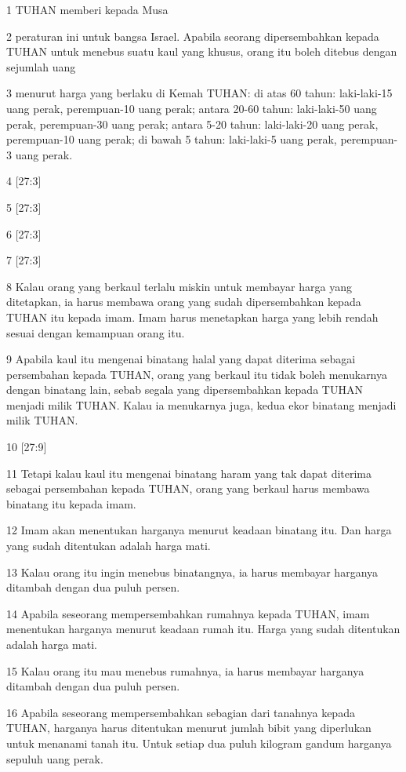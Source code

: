 \par 1 TUHAN memberi kepada Musa
\par 2 peraturan ini untuk bangsa Israel. Apabila seorang dipersembahkan kepada TUHAN untuk menebus suatu kaul yang khusus, orang itu boleh ditebus dengan sejumlah uang
\par 3 menurut harga yang berlaku di Kemah TUHAN: di atas 60 tahun: laki-laki-15 uang perak, perempuan-10 uang perak; antara 20-60 tahun: laki-laki-50 uang perak, perempuan-30 uang perak; antara 5-20 tahun: laki-laki-20 uang perak, perempuan-10 uang perak; di bawah 5 tahun: laki-laki-5 uang perak, perempuan-3 uang perak.
\par 4 [27:3]
\par 5 [27:3]
\par 6 [27:3]
\par 7 [27:3]
\par 8 Kalau orang yang berkaul terlalu miskin untuk membayar harga yang ditetapkan, ia harus membawa orang yang sudah dipersembahkan kepada TUHAN itu kepada imam. Imam harus menetapkan harga yang lebih rendah sesuai dengan kemampuan orang itu.
\par 9 Apabila kaul itu mengenai binatang halal yang dapat diterima sebagai persembahan kepada TUHAN, orang yang berkaul itu tidak boleh menukarnya dengan binatang lain, sebab segala yang dipersembahkan kepada TUHAN menjadi milik TUHAN. Kalau ia menukarnya juga, kedua ekor binatang menjadi milik TUHAN.
\par 10 [27:9]
\par 11 Tetapi kalau kaul itu mengenai binatang haram yang tak dapat diterima sebagai persembahan kepada TUHAN, orang yang berkaul harus membawa binatang itu kepada imam.
\par 12 Imam akan menentukan harganya menurut keadaan binatang itu. Dan harga yang sudah ditentukan adalah harga mati.
\par 13 Kalau orang itu ingin menebus binatangnya, ia harus membayar harganya ditambah dengan dua puluh persen.
\par 14 Apabila seseorang mempersembahkan rumahnya kepada TUHAN, imam menentukan harganya menurut keadaan rumah itu. Harga yang sudah ditentukan adalah harga mati.
\par 15 Kalau orang itu mau menebus rumahnya, ia harus membayar harganya ditambah dengan dua puluh persen.
\par 16 Apabila seseorang mempersembahkan sebagian dari tanahnya kepada TUHAN, harganya harus ditentukan menurut jumlah bibit yang diperlukan untuk menanami tanah itu. Untuk setiap dua puluh kilogram gandum harganya sepuluh uang perak.
